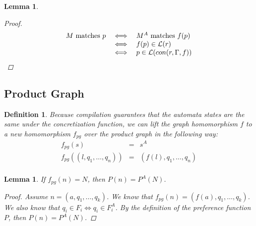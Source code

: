 \documentclass[twocolumn, openany]{sig-alternate-10pt}
\newtheorem{defn}{Definition}
\newtheorem{lem}[thm]{Lemma}
\begin{document}
\begin{lem}
\begin{proof}
    \[ \begin{array}{lll}
      M ~\text{matches}~ p &\iff& M^A ~\text{matches}~ f(p) \\
                         &\iff& f(p) \in \mathcal{L}(r) \\
                         &\iff& p \in \mathcal{L}(con(r,\Gamma,f)) \\
    \end{array} \]%

  \end{proof}

\end{lem}

\vspace{1em}
\subsection{Product Graph}

\begin{defn}
  Because compilation guarantees that the automata states are the same under the concretization function, we can lift the graph homomorphism $f$ to a new homomorphism $f_{pg}$ over the product graph in the following way:
  \[ \begin{array}{rcl}
    f_{pg}( s ) & = & s^A  \\
    f_{pg}( (l,q_1,\ldots,q_n) ) & = & (f(l),q_1,\ldots,q_n) \\
  \end{array} \]
\end{defn}

\vspace{1em}
\begin{lem}
  If $f_{pg}(n) = N$, then $P(n) = P^A(N)$.

  \begin{proof}
    Assume $n = (a,q_1,\dots,q_k)$. We know that $f_{pg}(n) = (f(a),q_1,\dots,q_k)$. 
    We also know that $q_i \in F_i \iff q_i \in F^A_i$. 
    By the definition of the preference function $P$, then $P(n) = P^A(N)$.
  \end{proof}

\end{lem}
\end{document}

